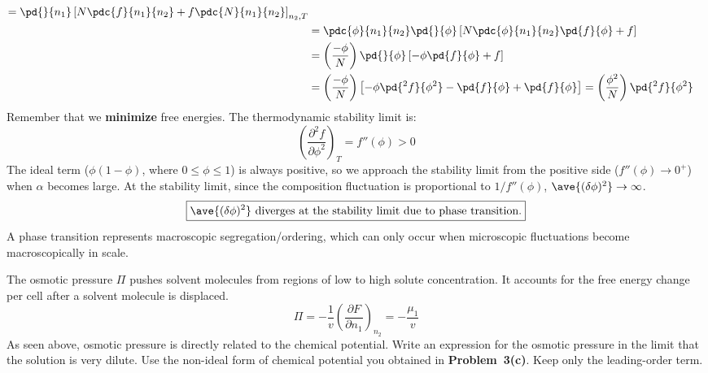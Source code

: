 {\begin{align*}
  = \pd{}{n_1} \left[ N \pdc{f}{n_1}{n_2} + f \pdc{N}{n_1}{n_2} \right]_{n_2,T} \\
 &= \pdc{\phi}{n_1}{n_2} \pd{}{\phi}
    \left[N \pdc{\phi}{n_1}{n_2} \pd{f}{\phi} + f \right] \\
 &= \left( \frac{-\phi}{N} \right) \pd{}{\phi}
    \left[-\phi \pd{f}{\phi} + f \right] \\
 &= \left( \frac{-\phi}{N} \right)
    \left[-\phi \pd{^2 f}{\phi^2} - \pd{f}{\phi} + \pd{f}{\phi} \right] 
  = \left( \frac{\phi^2}{N} \right) \pd{^2 f}{\phi^2}
\end{align*}
Remember that we {\bf minimize} free energies. 
The thermodynamic stability limit is:
\[ \boxed{ \left( \frac{\partial^2 f}{\partial \phi^2} \right)_T
 = f''(\phi) > 0 } \]
The ideal term ($\phi(1-\phi)$, where $0 \leq \phi \leq 1$) 
is always positive, so we approach the stability limit 
from the positive side ($f''(\phi) \rightarrow 0^+$)
when $\alpha$ becomes large. 
At the stability limit, since the composition fluctuation
is proportional to $1/f''(\phi)$, 
$\ave{(\delta \phi)^2} \rightarrow \infty$. 
\[ \boxed{ \ave{(\delta \phi)^2} \text{ diverges at the 
   stability limit due to phase transition.} }\]
A phase transition represents macroscopic segregation/ordering,
which can only occur when microscopic fluctuations become
macroscopically in scale. \\
}

\smallskip \subp
The osmotic pressure $\Pi$ pushes solvent molecules
from regions of low to high solute concentration.
It accounts for the free energy change per cell
after a solvent molecule is displaced.
\[ \Pi = - \frac{1}{v} \left( \frac{\partial F}{\partial n_1}  \right)_{n_2} 
       = - \frac{\mu_1}{v} \]
As seen above, osmotic pressure is directly related to the chemical potential.
Write an expression for the osmotic pressure
in the limit that the solution is very dilute. 
Use the non-ideal form of chemical potential 
you obtained in {\bf Problem~3(c)}.
Keep only the leading-order term.


